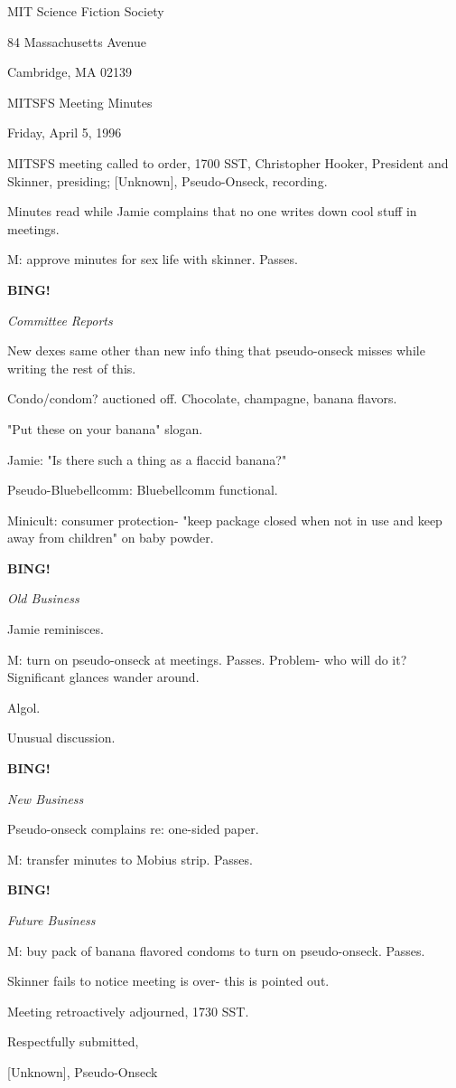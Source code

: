 \documentclass[12pt]{article}
\newcommand{\bing}{{\bf BING!} }
\newcommand{\goto}[1]{\bing \vskip 12pt \centerline{{\em{#1}}}}
\begin{document}
\begin{center}

MIT Science Fiction Society 

84 Massachusetts Avenue

Cambridge, MA 02139

\vspace{12pt}

MITSFS Meeting Minutes 

Friday, April 5, 1996

\end{center}
 
\vspace{18pt}

\setlength{\parskip}{6pt}

\noindent
MITSFS meeting called to order, 1700 SST,
Christopher Hooker, President and Skinner, presiding; [Unknown], Pseudo-Onseck, recording.

Minutes read while Jamie complains that no one writes down cool stuff in meetings.

M: approve minutes for sex life with skinner. Passes.

\goto{Committee Reports}

New dexes same other than new info thing that pseudo-onseck misses while writing the rest of this.

Condo/condom? auctioned off. Chocolate, champagne, banana flavors.

"Put these on your banana" slogan.

Jamie: "Is there such a thing as a flaccid banana?"

Pseudo-Bluebellcomm: Bluebellcomm functional.

Minicult: consumer protection- "keep package closed when not in use and keep away from children" on baby powder.

\goto{Old Business}

Jamie reminisces.

M: turn on pseudo-onseck at meetings. Passes. Problem- who will do it? Significant glances wander around.

Algol.

Unusual discussion.

\goto{New Business}

Pseudo-onseck complains re: one-sided paper.

M: transfer minutes to Mobius strip. Passes.

\goto{Future Business}

M: buy pack of banana flavored condoms to turn on pseudo-onseck. Passes.

Skinner fails to notice meeting is over- this is pointed out.

\vspace{12pt}

\noindent
Meeting retroactively adjourned, 1730 SST.

\vspace{18pt}

\centerline{Respectfully submitted,}
\centerline{[Unknown], Pseudo-Onseck}
\end{document}
